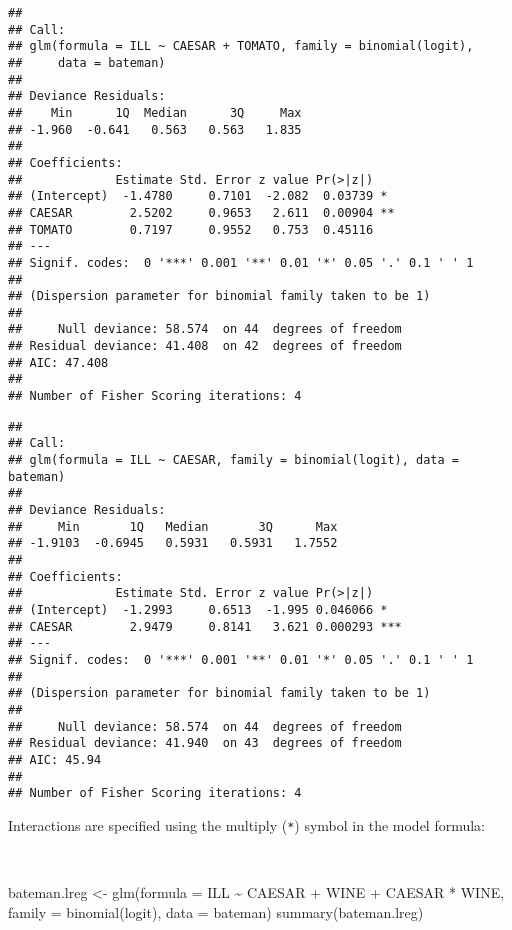\documentclass[
  12pt,
  a4paper]{book}
\newenvironment{Shaded}{\begin{snugshade}}{\end{snugshade}}
\newcommand{\AttributeTok}[1]{\textcolor[rgb]{0.77,0.63,0.00}{#1}}
\newcommand{\FunctionTok}[1]{\textcolor[rgb]{0.00,0.00,0.00}{#1}}
\newcommand{\NormalTok}[1]{#1}
\newcommand{\OtherTok}[1]{\textcolor[rgb]{0.56,0.35,0.01}{#1}}
\newcommand{\SpecialCharTok}[1]{\textcolor[rgb]{0.00,0.00,0.00}{#1}}
\begin{document}
\begin{verbatim}
## 
## Call:
## glm(formula = ILL ~ CAESAR + TOMATO, family = binomial(logit), 
##     data = bateman)
## 
## Deviance Residuals: 
##    Min      1Q  Median      3Q     Max  
## -1.960  -0.641   0.563   0.563   1.835  
## 
## Coefficients:
##             Estimate Std. Error z value Pr(>|z|)   
## (Intercept)  -1.4780     0.7101  -2.082  0.03739 * 
## CAESAR        2.5202     0.9653   2.611  0.00904 **
## TOMATO        0.7197     0.9552   0.753  0.45116   
## ---
## Signif. codes:  0 '***' 0.001 '**' 0.01 '*' 0.05 '.' 0.1 ' ' 1
## 
## (Dispersion parameter for binomial family taken to be 1)
## 
##     Null deviance: 58.574  on 44  degrees of freedom
## Residual deviance: 41.408  on 42  degrees of freedom
## AIC: 47.408
## 
## Number of Fisher Scoring iterations: 4
\end{verbatim}

\begin{verbatim}
## 
## Call:
## glm(formula = ILL ~ CAESAR, family = binomial(logit), data = bateman)
## 
## Deviance Residuals: 
##     Min       1Q   Median       3Q      Max  
## -1.9103  -0.6945   0.5931   0.5931   1.7552  
## 
## Coefficients:
##             Estimate Std. Error z value Pr(>|z|)    
## (Intercept)  -1.2993     0.6513  -1.995 0.046066 *  
## CAESAR        2.9479     0.8141   3.621 0.000293 ***
## ---
## Signif. codes:  0 '***' 0.001 '**' 0.01 '*' 0.05 '.' 0.1 ' ' 1
## 
## (Dispersion parameter for binomial family taken to be 1)
## 
##     Null deviance: 58.574  on 44  degrees of freedom
## Residual deviance: 41.940  on 43  degrees of freedom
## AIC: 45.94
## 
## Number of Fisher Scoring iterations: 4
\end{verbatim}

\newpage

Interactions are specified using the multiply (\texttt{*}) symbol in the model formula:

~

\begin{Shaded}
\begin{Highlighting}[]
\NormalTok{bateman.lreg }\OtherTok{\textless{}{-}} \FunctionTok{glm}\NormalTok{(}\AttributeTok{formula =}\NormalTok{ ILL }\SpecialCharTok{\textasciitilde{}}\NormalTok{ CAESAR }\SpecialCharTok{+}\NormalTok{ WINE }\SpecialCharTok{+}\NormalTok{ CAESAR }\SpecialCharTok{*}\NormalTok{ WINE,}
                    \AttributeTok{family =} \FunctionTok{binomial}\NormalTok{(logit), }\AttributeTok{data =}\NormalTok{ bateman)}
\FunctionTok{summary}\NormalTok{(bateman.lreg)}
\end{Highlighting}
\end{Shaded}
\end{document}
